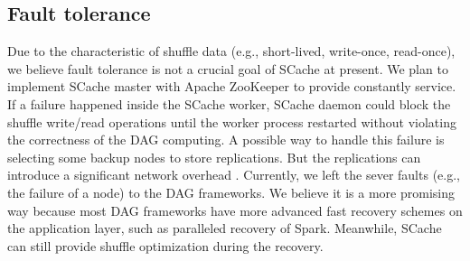\subsection{Fault tolerance}\label{fault}
Due to the characteristic of shuffle data (e.g., short-lived, write-once, read-once), we believe fault tolerance is not a crucial goal of SCache at present. 
We plan to implement SCache master with Apache ZooKeeper \cite{zookeeper} to provide constantly service. 
If a failure happened inside the SCache worker, SCache daemon could block the shuffle write/read operations until the worker process restarted without violating the correctness of the DAG computing.
A possible way to handle this failure is selecting some backup nodes to store replications. 
But the replications can introduce a significant network overhead \cite{availability}.  
Currently, we left the sever faults (e.g., the failure of a node) to the DAG frameworks. 
We believe it is a more promising way because most DAG frameworks have more advanced fast recovery schemes on the application layer, such as paralleled recovery of Spark. 
Meanwhile, SCache can still provide shuffle optimization during the recovery.





